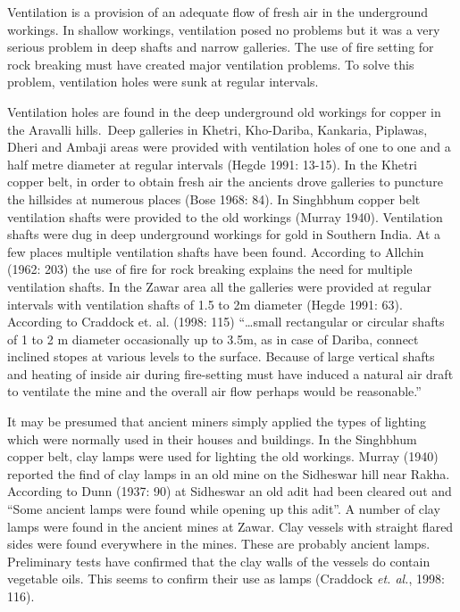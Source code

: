 
Ventilation is a provision of an adequate flow of fresh air in the underground workings. In shallow workings, ventilation posed no problems but it was a very serious problem in deep shafts and narrow galleries. The use of fire setting for rock breaking must have created major ventilation problems. To solve this problem, ventilation holes were sunk at regular intervals.

Ventilation holes are found in the deep underground old workings for copper in the Aravalli hills.~Deep galleries in Khetri, Kho-Dariba, Kankaria, Piplawas, Dheri and Ambaji areas were provided with ventilation holes of one to one and a half metre diameter at regular intervals (Hegde 1991: 13-15). In the Khetri copper belt, in order to obtain fresh air the ancients drove galleries to puncture the hillsides at numerous places (Bose 1968: 84). In Singhbhum copper belt ventilation shafts were provided to the old workings (Murray 1940). Ventilation shafts were dug in deep underground workings for gold in Southern India. At a few places multiple ventilation shafts have been found. According to Allchin (1962: 203) the use of fire for rock breaking explains the need for multiple ventilation shafts. In the Zawar area all the galleries were provided at regular intervals with ventilation shafts of 1.5 to 2m diameter (Hegde 1991: 63). According to Craddock {\rm et. al.} (1998: 115) “…small rectangular or circular shafts of 1 to 2 m diameter occasionally up to 3.5m, as in case of Dariba, connect inclined stopes at various levels to the surface. Because of large vertical shafts and heating of inside air during fire-setting must have induced a natural air draft to ventilate the mine and the overall air flow perhaps would be reasonable.”


It may be presumed that ancient miners simply applied the types of lighting which were normally used in their houses and buildings. In the Singhbhum copper belt, clay lamps were used for lighting the old workings. Murray (1940) reported the find of clay lamps in an old mine on the Sidheswar hill near Rakha. According to Dunn (1937: 90) at Sidheswar an old adit had been cleared out and “Some ancient lamps were found while opening up this adit”. A number of clay lamps were found in the ancient mines at Zawar. Clay vessels with straight flared sides were found everywhere in the mines. These are probably ancient lamps. Preliminary tests have confirmed that the clay walls of the vessels do contain vegetable oils. This seems to confirm their use as lamps (Craddock {\it et. al.}, 1998: 116). 

